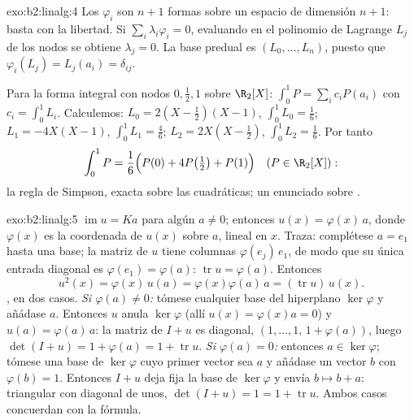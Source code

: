 \begin{solution}{exo:b2:linalg:4}
Los $\varphi_i$ son $n + 1$ formas sobre un espacio de dimensión $n +
1$: basta con la libertad. Si $\sum_i \lambda_i \varphi_i = 0$,
evaluando en el polinomio de Lagrange $L_j$ de los nodos se obtiene
$\lambda_j = 0$. La base predual es $(L_0, \dots, L_n)$, puesto que
$\varphi_i(L_j) = L_j(a_i) = \delta_{ij}$.

Para la forma integral con nodos $0, \frac12, 1$ sobre $\R_2[X]$:
$\int_0^1 P = \sum_i c_i P(a_i)$ con $c_i = \int_0^1 L_i$.
Calculemos: $L_0 = 2(X - \tfrac12)(X - 1)$, $\int_0^1 L_0 =
\frac16$; $L_1 = -4X(X-1)$, $\int_0^1 L_1 = \frac46$; $L_2 = 2X(X -
\tfrac12)$, $\int_0^1 L_2 = \frac16$. Por tanto
\[
\int_0^1 P = \frac{1}{6}\Bigl(P(0) + 4P\bigl(\tfrac12\bigr) +
P(1)\Bigr)
\quad (P \in \R_2[X]) :
\]
la regla de Simpson, exacta sobre las cuadráticas; un enunciado
sobre .
\end{solution}

\begin{solution}{exo:b2:linalg:5}
$\operatorname{im} u = Ka$ para algún $a \neq 0$; entonces $u(x) =
\varphi(x)\,a$, donde $\varphi(x)$ es la coordenada de $u(x)$ sobre
$a$, lineal en $x$. Traza: complétese $a = e_1$ hasta una base; la
matriz de $u$ tiene columnas $\varphi(e_j)\,e_1$, de modo que su
única entrada diagonal es $\varphi(e_1) = \varphi(a)$:
$\operatorname{tr} u = \varphi(a)$. Entonces
\[
u^2(x) = \varphi(x)\, u(a) = \varphi(x)\varphi(a)\, a
= (\operatorname{tr} u)\, u(x).
\]
, en dos casos. \emph{Si $\varphi(a) \neq 0$:} tómese
cualquier base del hiperplano $\ker\varphi$ y añádase $a$. Entonces
$u$ anula $\ker\varphi$ (allí $u(x) = \varphi(x)a = 0$) y $u(a) =
\varphi(a)\,a$: la matriz de $I + u$ es diagonal, $(1, \dots, 1,\, 1
+ \varphi(a))$, luego $\det(I + u) = 1 + \varphi(a) = 1 +
\operatorname{tr} u$. \emph{Si $\varphi(a) = 0$:} entonces $a \in
\ker\varphi$; tómese una base de $\ker\varphi$ cuyo primer vector sea
$a$ y añádase un vector $b$ con $\varphi(b) = 1$. Entonces $I + u$
deja fija la base de $\ker\varphi$ y envía $b \mapsto b + a$:
triangular con diagonal de unos, $\det(I + u) = 1 = 1 +
\operatorname{tr} u$. Ambos casos concuerdan con la fórmula.
\end{solution}

